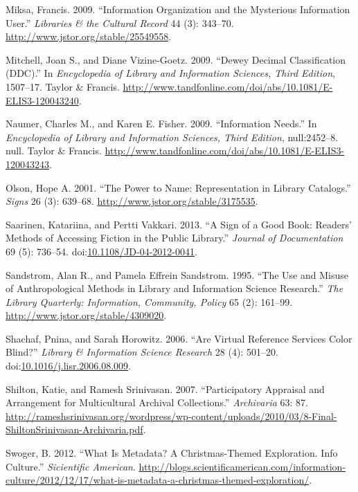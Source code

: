 \documentclass[]{article}
\begin{document}
\hypertarget{ref-miksaux5finformationux5f2009}{}
Miksa, Francis. 2009. ``Information Organization and the Mysterious
Information User.'' \emph{Libraries \& the Cultural Record} 44 (3):
343--70. \url{http://www.jstor.org/stable/25549558}.

\hypertarget{ref-mitchellux5fdeweyux5f2009}{}
Mitchell, Joan S., and Diane Vizine-Goetz. 2009. ``Dewey Decimal
Classification (DDC).'' In \emph{Encyclopedia of Library and Information
Sciences, Third Edition}, 1507--17. Taylor \& Francis.
\url{http://www.tandfonline.com/doi/abs/10.1081/E-ELIS3-120043240}.

\hypertarget{ref-naumerux5finformationux5f2009}{}
Naumer, Charles M., and Karen E. Fisher. 2009. ``Information Needs.'' In
\emph{Encyclopedia of Library and Information Sciences, Third Edition},
null:2452--8. null. Taylor \& Francis.
\url{http://www.tandfonline.com/doi/abs/10.1081/E-ELIS3-120043243}.

\hypertarget{ref-olsonux5fpowerux5f2001}{}
Olson, Hope A. 2001. ``The Power to Name: Representation in Library
Catalogs.'' \emph{Signs} 26 (3): 639--68.
\url{http://www.jstor.org/stable/3175535}.

\hypertarget{ref-saarinenux5fsignux5f2013}{}
Saarinen, Katariina, and Pertti Vakkari. 2013. ``A Sign of a Good Book:
Readers' Methods of Accessing Fiction in the Public Library.''
\emph{Journal of Documentation} 69 (5): 736--54.
doi:\href{https://doi.org/10.1108/JD-04-2012-0041}{10.1108/JD-04-2012-0041}.

\hypertarget{ref-sandstromux5fuseux5f1995}{}
Sandstrom, Alan R., and Pamela Effrein Sandstrom. 1995. ``The Use and
Misuse of Anthropological Methods in Library and Information Science
Research.'' \emph{The Library Quarterly: Information, Community, Policy}
65 (2): 161--99. \url{http://www.jstor.org/stable/4309020}.

\hypertarget{ref-shachafux5fareux5f2006}{}
Shachaf, Pnina, and Sarah Horowitz. 2006. ``Are Virtual Reference
Services Color Blind?'' \emph{Library \& Information Science Research}
28 (4): 501--20.
doi:\href{https://doi.org/10.1016/j.lisr.2006.08.009}{10.1016/j.lisr.2006.08.009}.

\hypertarget{ref-shiltonux5fparticipatoryux5f2007}{}
Shilton, Katie, and Ramesh Srinivasan. 2007. ``Participatory Appraisal
and Arrangement for Multicultural Archival Collections.''
\emph{Archivaria} 63: 87.
\url{http://rameshsrinivasan.org/wordpress/wp-content/uploads/2010/03/8-Final-ShiltonSrinivasan-Archivaria.pdf}.

\hypertarget{ref-swogerux5fwhatux5f2012}{}
Swoger, B. 2012. ``What Is Metadata? A Christmas-Themed Exploration.
Info Culture.'' \emph{Sicientific American}.
\href{http://blogs.scientificamerican.com/information-\%20culture/2012/12/17/what-is-metadata-a-christmas-themed-exploration/}{http://blogs.scientificamerican.com/information- culture/2012/12/17/what-is-metadata-a-christmas-themed-exploration/}.
\end{document}

